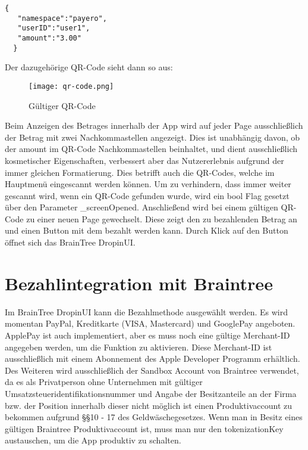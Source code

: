 \begin{lstlisting}[caption={Gültiger QR-Code}]
  {
   "namespace":"payero",
   "userID":"user1",
   "amount":"3.00"
  }
\end{lstlisting}

Der dazugehörige QR-Code sieht dann so aus:

\begin{figure}[H]
  \centering
  \texttt{[image: qr-code.png]}
  \caption{Gültiger QR-Code}
\end{figure}

Beim Anzeigen des Betrages innerhalb der App wird auf jeder Page ausschließlich der Betrag mit zwei Nachkommastellen angezeigt.
Dies ist unabhängig davon, ob der \glqq amount\grqq{} im QR-Code Nachkommastellen beinhaltet, und dient ausschließlich kosmetischer Eigenschaften, verbessert aber das Nutzererlebnis aufgrund der immer gleichen Formatierung.
Dies betrifft auch die QR-Codes, welche im Hauptmenü eingescannt werden können.
Um zu verhindern, dass immer weiter gescannt wird, wenn ein QR-Code gefunden wurde, wird ein bool Flag gesetzt über den Parameter \glqq \_screenOpened\grqq{}.
Anschließend wird bei einem gültigen QR-Code zu einer neuen Page gewechselt.
Diese zeigt den zu bezahlenden Betrag an und einen Button mit dem bezahlt werden kann.
Durch Klick auf den Button öffnet sich das BrainTree DropinUI.

\section{Bezahlintegration mit Braintree}

Im BrainTree DropinUI kann die Bezahlmethode ausgewählt werden.
Es wird momentan PayPal, Kreditkarte (VISA, Mastercard) und GooglePay angeboten.
ApplePay ist auch implementiert, aber es muss noch eine gültige Merchant-ID angegeben werden, um die Funktion zu aktivieren.
Diese Merchant-ID ist ausschließlich mit einem Abonnement des Apple Developer Programm erhältlich.
Des Weiteren wird ausschließlich der Sandbox Account von Braintree verwendet, da es als Privatperson ohne Unternehmen mit gültiger Umsatzsteueridentifikationsnummer und Angabe der Besitzanteile an der Firma bzw. der Position innerhalb dieser nicht möglich ist einen Produktivaccount zu bekommen aufgrund \S\S 10 - 17 des Geldwäschegesetzes.
Wenn man in Besitz eines gültigen Braintree Produktivaccount ist, muss man nur den \glqq tokenizationKey\grqq{} austauschen, um die App produktiv zu schalten.

